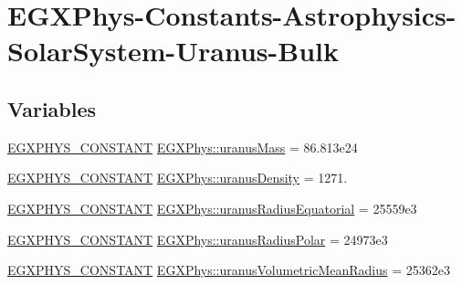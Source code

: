 \hypertarget{group___e_g_x_phys-_constants-_astrophysics-_solar_system-_uranus-_bulk}{}\section{E\+G\+X\+Phys-\/\+Constants-\/\+Astrophysics-\/\+Solar\+System-\/\+Uranus-\/\+Bulk}
\label{group___e_g_x_phys-_constants-_astrophysics-_solar_system-_uranus-_bulk}
\subsection*{Variables}
\begin{DoxyCompactItemize}
\item 
\mbox{\hyperlink{group___e_g_x_phys-_constants-_macros_ga76980d288494ce1714c9ac68a95ba702}{E\+G\+X\+P\+H\+Y\+S\+\_\+\+C\+O\+N\+S\+T\+A\+NT}} \mbox{\hyperlink{group___e_g_x_phys-_constants-_astrophysics-_solar_system-_uranus-_bulk_gaccabd738d57e4f5b6dc7b88d67b2cace}{E\+G\+X\+Phys\+::uranus\+Mass}} = 86.\+813e24
\item 
\mbox{\hyperlink{group___e_g_x_phys-_constants-_macros_ga76980d288494ce1714c9ac68a95ba702}{E\+G\+X\+P\+H\+Y\+S\+\_\+\+C\+O\+N\+S\+T\+A\+NT}} \mbox{\hyperlink{group___e_g_x_phys-_constants-_astrophysics-_solar_system-_uranus-_bulk_gaffdc8522dc72ce6a2c81fbae2720794f}{E\+G\+X\+Phys\+::uranus\+Density}} = 1271.
\item 
\mbox{\hyperlink{group___e_g_x_phys-_constants-_macros_ga76980d288494ce1714c9ac68a95ba702}{E\+G\+X\+P\+H\+Y\+S\+\_\+\+C\+O\+N\+S\+T\+A\+NT}} \mbox{\hyperlink{group___e_g_x_phys-_constants-_astrophysics-_solar_system-_uranus-_bulk_ga8610758fe64ac622528c0b951dd90e23}{E\+G\+X\+Phys\+::uranus\+Radius\+Equatorial}} = 25559e3
\item 
\mbox{\hyperlink{group___e_g_x_phys-_constants-_macros_ga76980d288494ce1714c9ac68a95ba702}{E\+G\+X\+P\+H\+Y\+S\+\_\+\+C\+O\+N\+S\+T\+A\+NT}} \mbox{\hyperlink{group___e_g_x_phys-_constants-_astrophysics-_solar_system-_uranus-_bulk_ga91b85385fee1afe5a4df54e4b4cbe7ad}{E\+G\+X\+Phys\+::uranus\+Radius\+Polar}} = 24973e3
\item 
\mbox{\hyperlink{group___e_g_x_phys-_constants-_macros_ga76980d288494ce1714c9ac68a95ba702}{E\+G\+X\+P\+H\+Y\+S\+\_\+\+C\+O\+N\+S\+T\+A\+NT}} \mbox{\hyperlink{group___e_g_x_phys-_constants-_astrophysics-_solar_system-_uranus-_bulk_gae20d0e7177a2cc5b86297f1ab2cf8400}{E\+G\+X\+Phys\+::uranus\+Volumetric\+Mean\+Radius}} = 25362e3

\end{DoxyCompactItemize}
